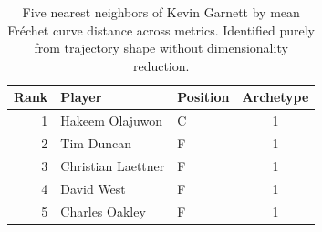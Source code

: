 \begin{table}[htbp]
  \centering\small
  \begin{tabular}{rllc}
    \toprule
    Rank & Player & Position & Archetype \\
    \midrule
    1 & Hakeem Olajuwon & C & 1 \\
    2 & Tim Duncan & F & 1 \\
    3 & Christian Laettner & F & 1 \\
    4 & David West & F & 1 \\
    5 & Charles Oakley & F & 1 \\
    \bottomrule
  \end{tabular}
  \caption{Five nearest neighbors of Kevin Garnett by mean Fr\'{e}chet curve distance across metrics. Identified purely from trajectory shape without dimensionality reduction.}
  \label{tab:Kevin_Garnett_frechet_curve_neighbors}
\end{table}

